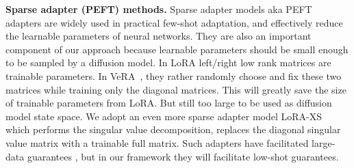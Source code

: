 \textbf{Sparse adapter (PEFT) methods.}
Sparse adapter models aka PEFT adapters are widely used in practical few-shot adaptation, and effectively reduce the learnable parameters of neural networks. They are also an important component of our approach because learnable parameters should be small enough to be sampled by a diffusion model. 
In LoRA  \cite{hu2021lora} left/right low rank matrices are trainable parameters. In VeRA~\citep{vera}, they rather randomly choose and fix these two matrices while training only the diagonal matrices. This will greatly save the size of trainable parameters from LoRA. But still too large to be used as diffusion model state space. We adopt an even more sparse adapter model %
LoRA-XS~\citep{loraxs} which performs the singular value decomposition, replaces the diagonal singular value matrix with a trainable full matrix. Such adapters have facilitated large-data guarantees \cite{lotfi2024nonvacuousLLM}, but in our framework they will facilitate low-shot guarantees.



